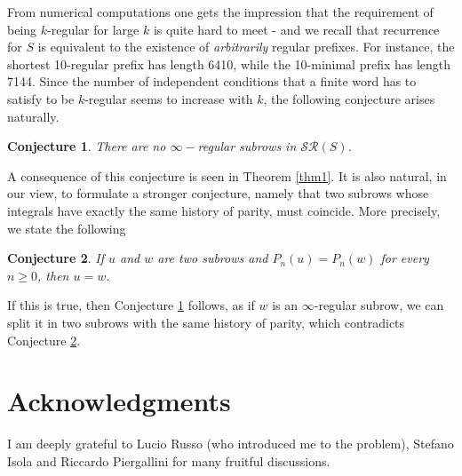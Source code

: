 \documentclass[10pt,a4paper]{article}
\newtheorem{conj}{Conjecture}
\begin{document}
From numerical computations one gets the impression that the requirement of being $k$-regular for large $k$ is quite hard to meet - and we recall that recurrence for $S$ is equivalent to the existence of \emph{arbitrarily} regular prefixes. For instance, the shortest 10-regular prefix has length 6410, while the 10-minimal prefix has length 7144. Since the number of independent conditions that a finite word has to satisfy to be $k$-regular seems to increase with $k$, the following conjecture arises naturally.
\begin{conj}
There are no $\infty-$regular subrows in $\mathcal{SR}(S)$.
\label{conj1}
\end{conj}
A consequence of this conjecture is seen in Theorem \ref{thm1}. It is also natural, in our view, to formulate a stronger conjecture, namely that two subrows whose integrals have exactly the same history of parity, must coincide. More precisely, we state the following
\begin{conj}
If $u$ and $w$ are two subrows and $P_n(u)=P_n(w)$ for every $n\ge 0$, then $u=w$.   
\label{conj2}
\end{conj}
If this is true, then Conjecture \ref{conj1} follows, as if $w$ is an $\infty$-regular subrow, we can split it in two subrows with the same history of parity, which contradicts Conjecture \ref{conj2}.

\section{Acknowledgments}
 I am deeply grateful to Lucio Russo (who introduced me to the problem), Stefano Isola and Riccardo Piergallini for many fruitful discussions.




\end{document}
